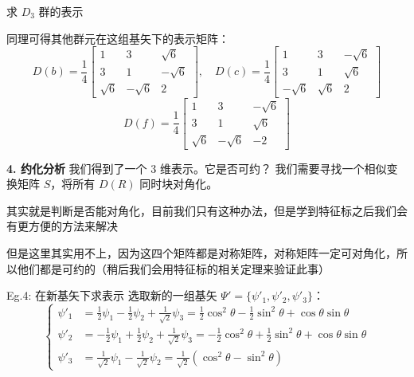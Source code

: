 \begin{example}{求 $D_3$ 群的表示}
    
    同理可得其他群元在这组基矢下的表示矩阵：
    \begin{equation}
        D(b) = \frac{1}{4} \begin{bmatrix} 1 & 3 & \sqrt{6} \\ 3 & 1 & -\sqrt{6} \\ \sqrt{6} & -\sqrt{6} & 2 \end{bmatrix}, \quad
        D(c) = \frac{1}{4} \begin{bmatrix} 1 & 3 & -\sqrt{6} \\ 3 & 1 & \sqrt{6} \\ -\sqrt{6} & \sqrt{6} & 2 \end{bmatrix}
    \end{equation}
    \begin{equation}
        D(f) = \frac{1}{4} \begin{bmatrix} 1 & 3 & -\sqrt{6} \\ 3 & 1 & \sqrt{6} \\ \sqrt{6} & -\sqrt{6} & -2 \end{bmatrix}
    \end{equation}
    

    \textbf{4. 约化分析}
    我们得到了一个 3 维表示。它是否可约？
    我们需要寻找一个相似变换矩阵 $S$，将所有 $D(R)$ 同时块对角化。

    其实就是判断是否能对角化，目前我们只有这种办法，但是学到特征标之后我们会有更方便的方法来解决

    但是这里其实用不上，因为这四个矩阵都是对称矩阵，对称矩阵一定可对角化，所以他们都是可约的（稍后我们会用特征标的相关定理来验证此事）

    \begin{example}{Eg.4: 在新基矢下求表示}
        选取新的一组基矢 $\Psi' = \{\psi'_1, \psi'_2, \psi'_3\}$：
        \begin{equation}
            \begin{cases}
                \psi'_1 &= \frac{1}{2}\psi_1 - \frac{1}{2}\psi_2 + \frac{1}{\sqrt{2}}\psi_3 = \frac{1}{2}\cos^2\theta - \frac{1}{2}\sin^2\theta + \cos\theta\sin\theta \\
                \psi'_2 &= -\frac{1}{2}\psi_1 + \frac{1}{2}\psi_2 + \frac{1}{\sqrt{2}}\psi_3 = -\frac{1}{2}\cos^2\theta + \frac{1}{2}\sin^2\theta + \cos\theta\sin\theta \\
                \psi'_3 &= \frac{1}{\sqrt{2}}\psi_1 - \frac{1}{\sqrt{2}}\psi_2 = \frac{1}{\sqrt{2}}(\cos^2\theta - \sin^2\theta) 
            \end{cases}
        \end{equation}
        


\end{example}
\end{example}
